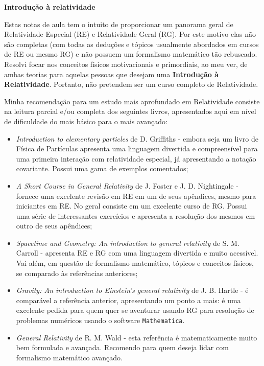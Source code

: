 \documentclass[12pt,a4paper,titlepage,brazil]{article}
\begin{document}
\begin{center}
 \LARGE{\bf Introdução à relatividade}
\end{center}


Estas notas de aula tem o intuito de proporcionar um panorama geral de Relatividade Especial (RE) e Relatividade Geral (RG). Por este motivo elas não são completas (com todas as deduções e tópicos usualmente abordados em cursos de RE ou mesmo RG) e não possuem um formalismo matemático tão rebuscado. Resolvi focar nos conceitos físicos motivacionais e primordiais, ao meu ver, de ambas teorias para aquelas pessoas que desejam uma {\bf Introdução à Relatividade}. Portanto, não pretendem ser um curso completo de Relatividade.

Minha recomendação para um estudo mais aprofundado em Relatividade consiste na leitura parcial e/ou completa dos seguintes livros, apresentados aqui em nível de dificuldade do mais básico para o mais avançado:

\begin{itemize}
 \item {\em Introduction to elementary particles} de D. Griffiths \cite{particulas} - embora seja um livro de Física de Partículas apresenta uma linguagem divertida e compreensível para uma primeira interação com relatividade especial, já apresentando a notação covariante. Possui uma gama de exemplos comentados;
 \item {\em A Short Course in General Relativity} de J. Foster e J. D. Nightingale \cite{nightingale2006} - fornece uma excelente revisão em RE em um de seus apêndices, mesmo para iniciantes em RE. No geral consiste em um excelente curso de RG. Possui uma série de interessantes exercícios e apresenta a resolução dos mesmos em outro de seus apêndices;
 \item {\em Spacetime and Geometry: An introduction to general relativity} de S. M. Carroll \cite{carroll2004} - apresenta RE e RG com uma linguagem divertida e muito acessível. Vai além, em questão de formalismo matemático, tópicos e conceitos físicos, se comparado às referências anteriores;
 \item {\em Gravity: An introduction to Einstein’s general relativity} de J. B. Hartle \cite{hartle2003}- é comparável a referência anterior, apresentando um ponto a mais: é uma excelente pedida para quem quer se aventurar usando RG para resolução de problemas numéricos usando o software \texttt{Mathematica}.
 \item {\em General Relativity} de R. M. Wald \cite{wald2010} - esta referência é matematicamente muito bem formulada e avançada. Recomendo para quem deseja lidar com formalismo matemático avançado.
\end{itemize}  
\end{document}
